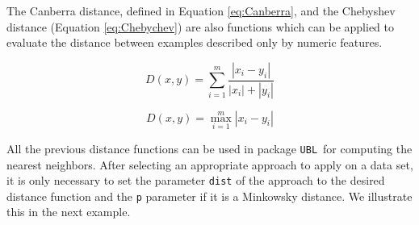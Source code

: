 \documentclass[10pt,a4paper]{article}\usepackage[]{graphicx}\usepackage[]{color}
\newcommand{\UBL}{package \texttt{UBL}\ }
\begin{document}
The Canberra distance, defined in Equation \ref{eq:Canberra}, and the Chebyshev distance (Equation \ref{eq:Chebychev}) are also functions which can be applied to evaluate the distance between examples described only by numeric features.



\begin{equation}\label{eq:Canberra}
D(x,y)= \sum_{i=1}^{m}\frac{|x_i-y_i|}{|x_i|+|y_i|}
\end{equation}

\begin{equation}\label{eq:Chebychev}
D(x,y)=\max_{i=1}^{m}|x_i-y_i|
\end{equation}

All the previous distance functions can be used in \UBL for computing the nearest neighbors. After selecting an appropriate approach to apply on a data set, it is only necessary to set the parameter \texttt{dist} of the approach to the desired distance function and the \texttt{p} parameter if it is a Minkowsky distance. We illustrate this in the next example.
\end{document}
